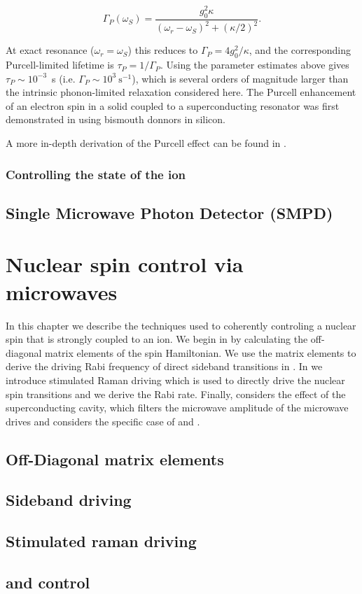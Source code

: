 \begin{equation}
    \Gamma_{P}(\omega_S) = \frac{g_0^2\kappa}{(\omega_r-\omega_S)^2 + (\kappa/2)^2}.
\end{equation}

At exact resonance ($\omega_r=\omega_S$) this reduces to $\Gamma_{P}=4g_0^2/\kappa$, and the corresponding Purcell-limited lifetime is $\tau_P = 1/\Gamma_{P}$. Using the parameter estimates above gives $\tau_P\sim10^{-3}$~s (i.e. $\Gamma_P\sim10^3\ \mathrm{s}^{-1}$), which is several orders of magnitude larger than the intrinsic phonon-limited relaxation considered here. The Purcell enhancement of an electron spin in a solid coupled to a superconducting resonator was first demonstrated in  using bismouth donnors in silicon.

A more in-depth derivation of the Purcell effect can be found in .

\subsection{Controlling the state of the \Er ion}

\section{Single Microwave Photon Detector (SMPD)}

\setchapterpreamble[u]{\margintoc}
\chapter{Nuclear spin control via microwaves}

In this chapter we describe the techniques used to coherently controling a nuclear spin that is strongly coupled to an \Er ion. We begin in  by calculating the off-diagonal matrix elements of the spin Hamiltonian. We use the matrix elements to derive the driving Rabi frequency of direct sideband transitions in . In  we introduce stimulated Raman driving which is used to directly drive the nuclear spin transitions and we derive the Rabi rate. Finally,  considers the effect of the superconducting cavity, which filters the microwave amplitude of the microwave drives and considers the specific case of \W and \Nb. 

\section{Off-Diagonal matrix elements}

\section{Sideband driving}

\section{Stimulated raman driving}

\section[183W and 93Nb control]{\W and \Nb control}
